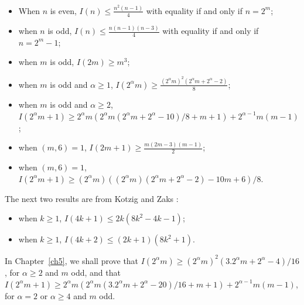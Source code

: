 \documentclass[12pt]{report}
\begin{document}
\begin{itemize}
\item When $n$ is even, $I(n) \leq \displaystyle\frac{n^2(n-1)}{4}$ with equality if and only if $n = 2^m$; 
\item when $n$ is odd, $I(n) \leq \displaystyle\frac{n(n-1)(n-3)}{4}$ with equality if and only if $n = 2^m - 1$; 
\item when $m$ is odd, $I(2m) \geq m^3$;
\item when $m$ is odd and $\alpha \geq 1$, $I(2^\alpha m) \geq \displaystyle\frac{(2^\alpha m)^2 (2^\alpha m + 2^\alpha - 2)}{8}$;
\item when $m$ is odd and $\alpha \geq 2$, $I(2^\alpha m + 1) \geq 2^\alpha m ( 2^\alpha m(2^\alpha m + 2^\alpha - 10)/8 + m + 1 ) + 2^{\alpha-1} m(m-1)$;
\item when $(m,6) = 1$, $I(2m+1) \geq \displaystyle\frac{m(2m-3)(m-1)}{2}$;
\item when $(m,6) = 1$, $I(2^\alpha m+1) \geq (2^\alpha m) ( (2^\alpha m) (2^\alpha m+2^\alpha - 2)-10m+6 ) /8$.
\end{itemize}

The next two results are from Kotzig and Zaks \cite{MR85h:05026}:
\begin{itemize}
\item when $k \geq 1$, $I(4k+1) \leq 2k(8k^2-4k-1)$;
\item when $k \geq 1$, $I(4k+2) \leq (2k+1)(8k^2+1)$.
\end{itemize}

In Chapter~\ref{ch5}, we shall prove that 
$I(2^\alpha m) \geq (2^\alpha m)^2
(3.2^\alpha m + 2^\alpha - 4)/16$, for $\alpha \geq 2$ and $m$ odd,
and that $I(2^\alpha m + 1) \geq 2^\alpha m (
2^\alpha m (3.2^\alpha m+2^\alpha - 20)/16 + m + 1 ) + 2^{\alpha-1}
m(m-1)$, for $\alpha = 2$ or $\alpha \geq 4$ and $m$ odd.







\end{document}
